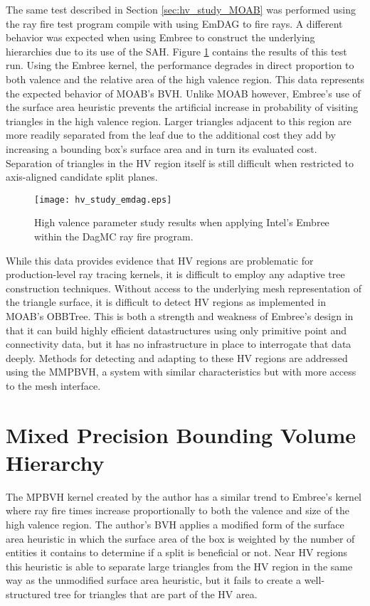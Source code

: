 The same test described in Section \ref{sec:hv_study_MOAB} was performed
using the ray fire test program compile with using EmDAG to fire rays. A
different behavior was expected when using Embree to construct the underlying
hierarchies due to its use of the SAH. Figure \ref{fig:hv_study_emdag} contains
the results of this test run. Using the Embree kernel, the performance degrades
in direct proportion to both valence and the relative area of the high valence
region. This data represents the expected behavior of MOAB's BVH. Unlike MOAB
however, Embree's use of the surface area heuristic prevents the artificial
increase in probability of visiting triangles in the high valence region. Larger
triangles adjacent to this region are more readily separated from the leaf due
to the additional cost they add by increasing a bounding box's surface area and
in turn its evaluated cost. Separation of triangles in the HV region itself is
still difficult when restricted to axis-aligned candidate split planes.

\begin{figure}[H]
  \centering
    \texttt{[image: hv\_study\_emdag.eps]}
    \caption{High valence parameter study results when applying Intel's Embree
      within the DagMC ray fire program.}
    \label{fig:hv_study_emdag}
\end{figure}

While this data provides evidence that HV regions are problematic for
production-level ray tracing kernels, it is difficult to employ any adaptive
tree construction techniques. Without access to the underlying mesh
representation of the triangle surface, it is difficult to detect HV regions as
implemented in MOAB's OBBTree. This is both a strength and weakness of Embree's
design in that it can build highly efficient datastructures using only primitive
point and connectivity data, but it has no infrastructure in place to
interrogate that data deeply. Methods for detecting and adapting to these HV
regions are addressed using the MMPBVH, a system with similar characteristics
but with more access to the mesh interface.

\section{Mixed Precision Bounding Volume Hierarchy}\label{sec:simd_hv_study}

The MPBVH kernel created by the author has a similar trend to Embree's
kernel where ray fire times increase proportionally to both the valence and size
of the high valence region. The author's BVH applies a modified form of the
surface area heuristic in which the surface area of the box is weighted by the
number of entities it contains to determine if a split is beneficial or
not. Near HV regions this heuristic is able to separate large triangles from the
HV region in the same way as the unmodified surface area heuristic, but it
fails to create a well-structured tree for triangles that are part of the HV area.

